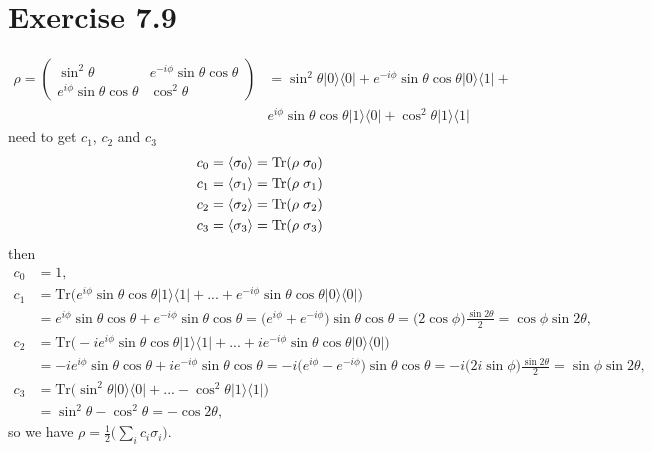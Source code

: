 \documentclass{article}
\newcommand{\op}[2]{|#1\rangle \langle#2|}
\begin{document}
\section*{Exercise 7.9}
\begin{align*}
    \rho = \begin{pmatrix}
        \sin^2\theta & e^{-i\phi}\sin\theta\cos\theta \\
        e^{i\phi}\sin\theta\cos\theta & \cos^2\theta
    \end{pmatrix} &= \sin^2\theta\op{0}{0} + e^{-i\phi}\sin\theta\cos\theta\op{0}{1} + \\&e^{i\phi}\sin\theta\cos\theta\op{1}{0} + \cos^2\theta\op{1}{1}
\end{align*}
need to get $c_{1}$, $c_{2}$ and $c_{3}$
\begin{align*}
    c_{0} = \braket{\sigma_0} = \text{Tr}(\rho\hspace{0.1cm} \sigma_0)\\
    c_{1} = \braket{\sigma_1} = \text{Tr}(\rho\hspace{0.1cm} \sigma_1)\\
    c_{2} = \braket{\sigma_2} = \text{Tr}(\rho\hspace{0.1cm} \sigma_2)\\
    c_{3} = \braket{\sigma_3} = \text{Tr}(\rho\hspace{0.1cm} \sigma_3)
\end{align*}
then
\begin{align*}
    c_{0} &= 1, \\
    c_{1} &= \text{Tr}\bigg(e^{i\phi}\sin\theta\cos\theta\op{1}{1}+...+e^{-i\phi}\sin\theta\cos\theta\op{0}{0}\bigg)\\
    &= e^{i\phi}\sin\theta\cos\theta + e^{-i\phi}\sin\theta\cos\theta = \bigg(e^{i\phi}+e^{-i\phi}\bigg)\sin\theta\cos\theta = \bigg(2\cos\phi\bigg)\frac{\sin2\theta}{2} = \cos\phi\sin2\theta,\\
    c_{2} &= \text{Tr}\bigg(-ie^{i\phi}\sin\theta\cos\theta\op{1}{1}+...+ie^{-i\phi}\sin\theta\cos\theta\op{0}{0}\bigg)\\
    &= -ie^{i\phi}\sin\theta\cos\theta + ie^{-i\phi}\sin\theta\cos\theta = -i\bigg(e^{i\phi}-e^{-i\phi}\bigg)\sin\theta\cos\theta = -i\bigg(2i\sin\phi\bigg)\frac{\sin2\theta}{2} = \sin\phi\sin2\theta, \\
    c_{3} &= \text{Tr}\bigg(\sin^2\theta\op{0}{0}+...-\cos^2\theta\op{1}{1}\bigg)\\
    &= \sin^2\theta - \cos^2\theta = -\cos2\theta,
\end{align*}
so we have $\displaystyle\rho = \frac{1}{2}\bigg(\sum_i c_i \sigma_i\bigg)$.
\end{document}
